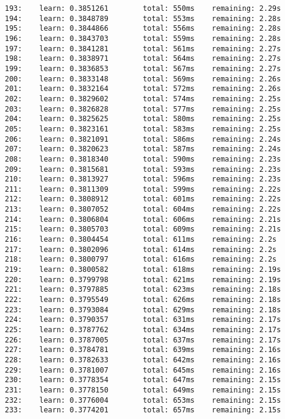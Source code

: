 \documentclass[11pt]{article}
\begin{document}
\begin{Verbatim}[commandchars=\\\{\}]
193:    learn: 0.3851261        total: 550ms    remaining: 2.29s
194:    learn: 0.3848789        total: 553ms    remaining: 2.28s
195:    learn: 0.3844866        total: 556ms    remaining: 2.28s
196:    learn: 0.3843703        total: 559ms    remaining: 2.28s
197:    learn: 0.3841281        total: 561ms    remaining: 2.27s
198:    learn: 0.3838971        total: 564ms    remaining: 2.27s
199:    learn: 0.3836853        total: 567ms    remaining: 2.27s
200:    learn: 0.3833148        total: 569ms    remaining: 2.26s
201:    learn: 0.3832164        total: 572ms    remaining: 2.26s
202:    learn: 0.3829602        total: 574ms    remaining: 2.25s
203:    learn: 0.3826828        total: 577ms    remaining: 2.25s
204:    learn: 0.3825625        total: 580ms    remaining: 2.25s
205:    learn: 0.3823161        total: 583ms    remaining: 2.25s
206:    learn: 0.3821091        total: 586ms    remaining: 2.24s
207:    learn: 0.3820623        total: 587ms    remaining: 2.24s
208:    learn: 0.3818340        total: 590ms    remaining: 2.23s
209:    learn: 0.3815681        total: 593ms    remaining: 2.23s
210:    learn: 0.3813927        total: 596ms    remaining: 2.23s
211:    learn: 0.3811309        total: 599ms    remaining: 2.22s
212:    learn: 0.3808912        total: 601ms    remaining: 2.22s
213:    learn: 0.3807052        total: 604ms    remaining: 2.22s
214:    learn: 0.3806804        total: 606ms    remaining: 2.21s
215:    learn: 0.3805703        total: 609ms    remaining: 2.21s
216:    learn: 0.3804454        total: 611ms    remaining: 2.2s
217:    learn: 0.3802096        total: 614ms    remaining: 2.2s
218:    learn: 0.3800797        total: 616ms    remaining: 2.2s
219:    learn: 0.3800582        total: 618ms    remaining: 2.19s
220:    learn: 0.3799798        total: 621ms    remaining: 2.19s
221:    learn: 0.3797885        total: 623ms    remaining: 2.18s
222:    learn: 0.3795549        total: 626ms    remaining: 2.18s
223:    learn: 0.3793084        total: 629ms    remaining: 2.18s
224:    learn: 0.3790357        total: 631ms    remaining: 2.17s
225:    learn: 0.3787762        total: 634ms    remaining: 2.17s
226:    learn: 0.3787005        total: 637ms    remaining: 2.17s
227:    learn: 0.3784781        total: 639ms    remaining: 2.16s
228:    learn: 0.3782633        total: 642ms    remaining: 2.16s
229:    learn: 0.3781007        total: 645ms    remaining: 2.16s
230:    learn: 0.3778354        total: 647ms    remaining: 2.15s
231:    learn: 0.3778150        total: 649ms    remaining: 2.15s
232:    learn: 0.3776004        total: 653ms    remaining: 2.15s
233:    learn: 0.3774201        total: 657ms    remaining: 2.15s

\end{Verbatim}
\end{document}
